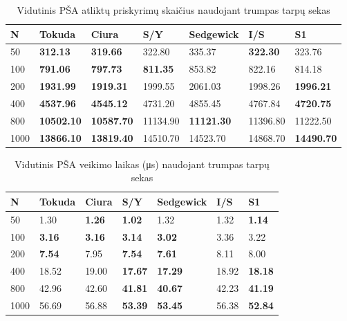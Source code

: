 \documentclass{VUMIFInfKursinis}
\begin{document}
\begin{table}[H]
  \caption{Vidutinis PŠA atliktų priskyrimų skaičius naudojant trumpas tarpų sekas}
  \label{iss_small_assignments}
  \begin{tabular}{|l|l|l|l|l|l|l|}
  \hline
  N    & Tokuda            & Ciura             & S/Y             & Sedgewick         & I/S             & S1                \\ \hline
  50   & \textbf{312.13}   & \textbf{319.66}   & 322.80          & 335.37            & \textbf{322.30} & 323.76            \\ \hline
  100  & \textbf{791.06}   & \textbf{797.73}   & \textbf{811.35} & 853.82            & 822.16          & 814.18            \\ \hline
  200  & \textbf{1931.99}  & \textbf{1919.31}  & 1999.55         & 2061.03           & 1998.26         & \textbf{1996.21}  \\ \hline
  400  & \textbf{4537.96}  & \textbf{4545.12}  & 4731.20         & 4855.45           & 4767.84         & \textbf{4720.75}  \\ \hline
  800  & \textbf{10502.10} & \textbf{10587.70} & 11134.90        & \textbf{11121.30} & 11396.80        & 11222.50          \\ \hline
  1000 & \textbf{13866.10} & \textbf{13819.40} & 14510.70        & 14523.70          & 14868.70        & \textbf{14490.70} \\ \hline
  \end{tabular}
  \end{table}

\begin{table}[H]
  \caption{Vidutinis PŠA veikimo laikas (μs) naudojant trumpas tarpų sekas}
  \label{iss_small_runtimes}
  \begin{tabular}{|l|l|l|l|l|l|l|}
  \hline
  N    & Tokuda        & Ciura         & S/Y            & Sedgewick      & I/S   & S1             \\ \hline
  50   & 1.30          & \textbf{1.26} & \textbf{1.02}  & 1.32           & 1.32  & \textbf{1.14}  \\ \hline
  100  & \textbf{3.16} & \textbf{3.16} & \textbf{3.14}  & \textbf{3.02}  & 3.36  & 3.22           \\ \hline
  200  & \textbf{7.54} & 7.95          & \textbf{7.54}  & \textbf{7.61}  & 8.11  & 8.00           \\ \hline
  400  & 18.52         & 19.00         & \textbf{17.67} & \textbf{17.29} & 18.92 & \textbf{18.18} \\ \hline
  800  & 42.96         & 42.60         & \textbf{41.81} & \textbf{40.67} & 42.23 & \textbf{41.19} \\ \hline
  1000 & 56.69         & 56.88         & \textbf{53.39} & \textbf{53.45} & 56.38 & \textbf{52.84} \\ \hline
  \end{tabular}
  \end{table}
\end{document}
